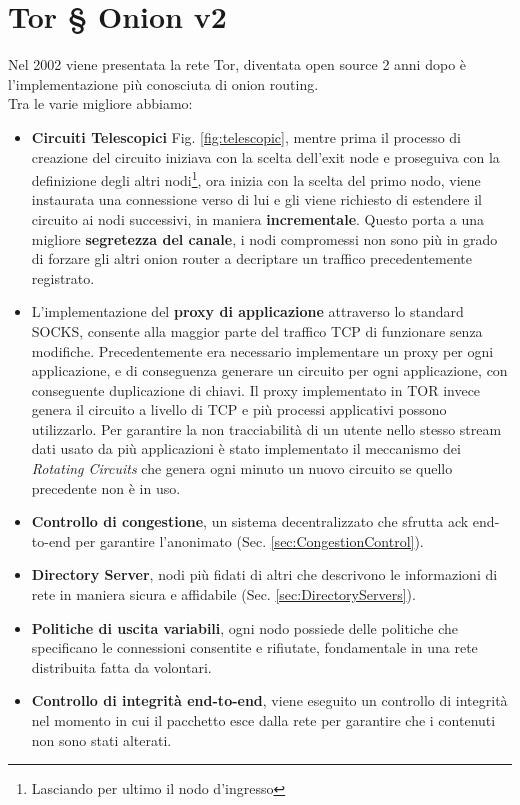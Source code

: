 \chapter{Tor § Onion v2}
\label{chap:Capitolo2}
Nel 2002 viene presentata la rete Tor, diventata open source 2 anni dopo è l'implementazione più conosciuta di onion routing. \\
Tra le varie migliore abbiamo:
\begin{itemize}
    \item \textbf{Circuiti Telescopici} Fig. \ref{fig:telescopic}, mentre prima il processo di creazione del circuito iniziava con la scelta dell'exit node e proseguiva con la definizione degli altri nodi\footnote{Lasciando per ultimo il nodo d'ingresso}, ora inizia con la scelta del primo nodo, viene instaurata una connessione verso di lui e gli viene richiesto di estendere il circuito ai nodi successivi, in maniera \textbf{incrementale}. Questo porta a una migliore \textbf{segretezza del canale}, i nodi compromessi non sono più in grado di forzare gli altri onion router a decriptare un traffico precedentemente registrato.
    
    \item L'implementazione del \textbf{proxy di applicazione} attraverso lo standard SOCKS, consente alla maggior parte del traffico TCP di funzionare senza modifiche. Precedentemente era necessario implementare un proxy per ogni applicazione, e di conseguenza generare un circuito per ogni applicazione, con conseguente duplicazione di chiavi. Il proxy implementato in TOR invece genera il circuito a livello di TCP e più processi applicativi possono utilizzarlo. Per garantire la non tracciabilità di un utente nello stesso stream dati usato da più applicazioni è stato implementato il meccanismo dei \emph{Rotating Circuits} che genera ogni minuto un nuovo circuito se quello precedente non è in uso.
    
    \item \textbf{Controllo di congestione}, un sistema decentralizzato che sfrutta ack end-to-end per garantire l'anonimato (Sec. \ref{sec:CongestionControl}).
    \item \textbf{Directory Server}, nodi più fidati di altri che descrivono le informazioni di rete in maniera sicura e affidabile (Sec. \ref{sec:DirectoryServers}).
    \item \textbf{Politiche di uscita variabili}, ogni nodo possiede delle politiche che specificano le connessioni consentite e rifiutate, fondamentale in una rete distribuita fatta da volontari.
    \item \textbf{Controllo di integrità end-to-end}, viene eseguito un controllo di integrità nel momento in cui il pacchetto esce dalla rete per garantire che i contenuti non sono stati alterati.
\end{itemize}

